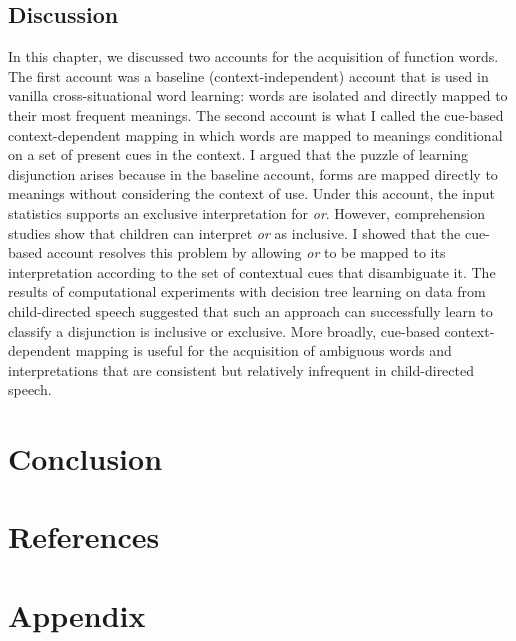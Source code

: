 \documentclass[floatsintext,man]{apa6}
\theoremstyle{definition}
\theoremstyle{definition}
\theoremstyle{definition}
\theoremstyle{remark}
\begin{document}
\subsection{Discussion}\label{discussion-1}

In this chapter, we discussed two accounts for the acquisition of
function words. The first account was a baseline (context-independent)
account that is used in vanilla cross-situational word learning: words
are isolated and directly mapped to their most frequent meanings. The
second account is what I called the cue-based context-dependent mapping
in which words are mapped to meanings conditional on a set of present
cues in the context. I argued that the puzzle of learning disjunction
arises because in the baseline account, forms are mapped directly to
meanings without considering the context of use. Under this account, the
input statistics supports an exclusive interpretation for \emph{or}.
However, comprehension studies show that children can interpret
\emph{or} as inclusive. I showed that the cue-based account resolves
this problem by allowing \emph{or} to be mapped to its interpretation
according to the set of contextual cues that disambiguate it. The
results of computational experiments with decision tree learning on data
from child-directed speech suggested that such an approach can
successfully learn to classify a disjunction is inclusive or exclusive.
More broadly, cue-based context-dependent mapping is useful for the
acquisition of ambiguous words and interpretations that are consistent
but relatively infrequent in child-directed speech.

\section{Conclusion}\label{conclusion}

\newpage

\section{References}\label{references}

\section{Appendix}\label{appendix}
\end{document}
